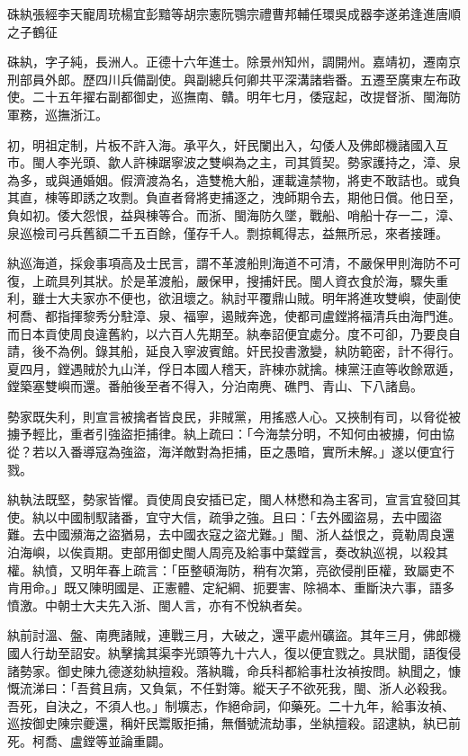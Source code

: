 
\begin{pinyinscope}
硃紈張經李天寵周珫楊宜彭黯等胡宗憲阮鶚宗禮曹邦輔任環吳成器李遂弟逢進唐順之子鶴征

硃紈，字子純，長洲人。正德十六年進士。除景州知州，調開州。嘉靖初，遷南京刑部員外郎。歷四川兵備副使。與副總兵何卿共平深溝諸砦番。五遷至廣東左布政使。二十五年擢右副都御史，巡撫南、贛。明年七月，倭寇起，改提督浙、閩海防軍務，巡撫浙江。

初，明祖定制，片板不許入海。承平久，奸民闌出入，勾倭人及佛郎機諸國入互市。閩人李光頭、歙人許棟踞寧波之雙嶼為之主，司其質契。勢家護持之，漳、泉為多，或與通婚姻。假濟渡為名，造雙桅大船，運載違禁物，將吏不敢詰也。或負其直，棟等即誘之攻剽。負直者脅將吏捕逐之，洩師期令去，期他日償。他日至，負如初。倭大怨恨，益與棟等合。而浙、閩海防久墜，戰船、哨船十存一二，漳、泉巡檢司弓兵舊額二千五百餘，僅存千人。剽掠輒得志，益無所忌，來者接踵。

紈巡海道，採僉事項高及士民言，謂不革渡船則海道不可清，不嚴保甲則海防不可復，上疏具列其狀。於是革渡船，嚴保甲，搜捕奸民。閩人資衣食於海，驟失重利，雖士大夫家亦不便也，欲沮壞之。紈討平覆鼎山賊。明年將進攻雙嶼，使副使柯喬、都指揮黎秀分駐漳、泉、福寧，遏賊奔逸，使都司盧鏜將福清兵由海門進。而日本貢使周良違舊約，以六百人先期至。紈奉詔便宜處分。度不可卻，乃要良自請，後不為例。錄其船，延良入寧波賓館。奸民投書激變，紈防範密，計不得行。夏四月，鏜遇賊於九山洋，俘日本國人稽天，許棟亦就擒。棟黨汪直等收餘眾遁，鏜築塞雙嶼而還。番舶後至者不得入，分泊南麂、礁門、青山、下八諸島。

勢家既失利，則宣言被擒者皆良民，非賊黨，用搖惑人心。又挾制有司，以脅從被擄予輕比，重者引強盜拒捕律。紈上疏曰：「今海禁分明，不知何由被擄，何由協從？若以入番導寇為強盜，海洋敵對為拒捕，臣之愚暗，實所未解。」遂以便宜行戮。

紈執法既堅，勢家皆懼。貢使周良安插已定，閩人林懋和為主客司，宣言宜發回其使。紈以中國制馭諸番，宜守大信，疏爭之強。且曰：「去外國盜易，去中國盜難。去中國瀕海之盜猶易，去中國衣寇之盜尤難。」閩、浙人益恨之，竟勒周良還泊海嶼，以俟貢期。吏部用御史閩人周亮及給事中葉鏜言，奏改紈巡視，以殺其權。紈憤，又明年春上疏言：「臣整頓海防，稍有次第，亮欲侵削臣權，致屬吏不肯用命。」既又陳明國是、正憲體、定紀綱、扼要害、除禍本、重斷決六事，語多憤激。中朝士大夫先入浙、閩人言，亦有不悅紈者矣。

紈前討溫、盤、南麂諸賊，連戰三月，大破之，還平處州礦盜。其年三月，佛郎機國人行劫至詔安。紈擊擒其渠李光頭等九十六人，復以便宜戮之。具狀聞，語復侵諸勢家。御史陳九德遂劾紈擅殺。落紈職，命兵科都給事杜汝禎按問。紈聞之，慷慨流涕曰：「吾貧且病，又負氣，不任對簿。縱天子不欲死我，閩、浙人必殺我。吾死，自決之，不須人也。」制壙志，作絕命詞，仰藥死。二十九年，給事汝禎、巡按御史陳宗夔還，稱奸民鬻販拒捕，無僭號流劫事，坐紈擅殺。詔逮紈，紈已前死。柯喬、盧鏜等並論重闢。


\end{pinyinscope}
